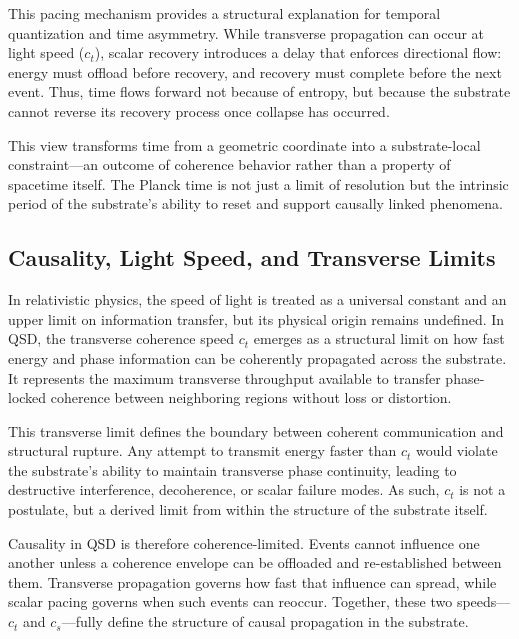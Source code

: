 \documentclass[entropy,article,submit,pdftex,moreauthors]{Definitions/mdpi}
\begin{document}
This pacing mechanism provides a structural explanation for temporal quantization and time asymmetry. While transverse propagation can occur at light speed (\texorpdfstring{\( c_t \)}{ct}), scalar recovery introduces a delay that enforces directional flow: energy must offload before recovery, and recovery must complete before the next event. Thus, time flows forward not because of entropy, but because the substrate cannot reverse its recovery process once collapse has occurred.

This view transforms time from a geometric coordinate into a substrate-local constraint—an outcome of coherence behavior rather than a property of spacetime itself. The Planck time is not just a limit of resolution but the intrinsic period of the substrate’s ability to reset and support causally linked phenomena.
\subsection{Causality, Light Speed, and Transverse Limits}

In relativistic physics, the speed of light is treated as a universal constant and an upper limit on information transfer, but its physical origin remains undefined. In QSD, the transverse coherence speed \texorpdfstring{\( c_t \)}{ct} emerges as a structural limit on how fast energy and phase information can be coherently propagated across the substrate. It represents the maximum transverse throughput available to transfer phase-locked coherence between neighboring regions without loss or distortion.

This transverse limit defines the boundary between coherent communication and structural rupture. Any attempt to transmit energy faster than \texorpdfstring{\( c_t \)}{ct} would violate the substrate's ability to maintain transverse phase continuity, leading to destructive interference, decoherence, or scalar failure modes. As such, \texorpdfstring{\( c_t \)}{ct} is not a postulate, but a derived limit from within the structure of the substrate itself.

Causality in QSD is therefore coherence-limited. Events cannot influence one another unless a coherence envelope can be offloaded and re-established between them. Transverse propagation governs how fast that influence can spread, while scalar pacing governs when such events can reoccur. Together, these two speeds—\texorpdfstring{\( c_t \)}{ct} and \texorpdfstring{\( c_s \)}{cs}—fully define the structure of causal propagation in the substrate.
\end{document}
